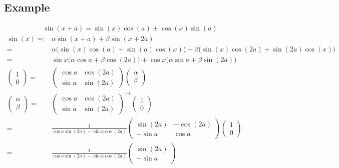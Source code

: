 \documentclass{article}
\begin{document}
\subsection{Example}
\begin{align}
\sin(x+a) = \sin(x)\cos(a) + \cos(x)\sin(a) \label{sin(a+b)}
\end{align}
\begin{align}
\sin(x) \eqqcolon& \alpha\sin(x+a) + \beta\sin(x+2a) \nonumber\\
=& \alpha\big(\sin(x)\cos(a) + \sin(a)\cos(x)\big) + \beta\big(\sin(x)\cos(2a) + \sin(2a)\cos(x)\big) \nonumber\\
=& \sin x\big( \alpha\cos a + \beta\cos(2a) \big) + \cos x\big( \alpha\sin a + \beta\sin(2a) \big) \\
\left( \begin{array}{c} 1 \\ 0 \end{array}\right) =& \left( \begin{array}{cc} \cos a & \cos(2a) \\ \sin a & \sin(2a) \end{array}\right) \left( \begin{array}{c} \alpha \\ \beta \end{array}\right)\\
\left( \begin{array}{c} \alpha \\ \beta \end{array}\right) =& \left( \begin{array}{cc} \cos a & \cos(2a) \\ \sin a & \sin(2a) \end{array}\right)^{-1} \left( \begin{array}{c} 1 \\ 0 \end{array}\right) \nonumber\\
=& \frac 1{\cos a\sin(2a) - \sin a\cos(2a)} \left( \begin{array}{cc} \sin(2a) & -\cos(2a) \\ -\sin a & \cos a \end{array}\right) \left( \begin{array}{c} 1 \\ 0 \end{array}\right) \nonumber\\
=& \frac 1{\cos a\sin(2a) - \sin a\cos(2a)} \left( \begin{array}{c} \sin(2a) \\ -\sin a \end{array}\right) \nonumber\\

\end{align}
\end{document}
